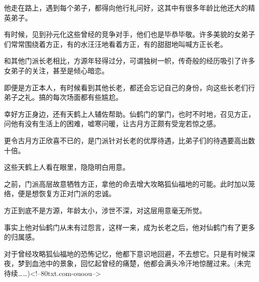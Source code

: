 \begin{this_body}
他走在路上，遇到每个弟子，都得向他行礼问好，这其中有很多年龄比他还大的精英弟子。

有时候，见到孙元化这些曾经的竞争对手，他们也是毕恭毕敬。许多美貌的女弟子们常常围绕着方正，有的水汪汪地看着方正，有的甜甜地叫喊方正长老。

和其他门派长老相比，方源年轻得过分，可谓独树一帜，传奇般的经历吸引了许多女弟子的关注，甚至是倾心暗恋。

即便是方正本人，有时候看到其他长老，都还会忘记自己的身份，向这些长老们行弟子之礼。搞的每次场面都有些尴尬。

幸好方正身边，还有天鹤上人辅佐帮助。仙鹤门的掌门，也时不时地，召见方正，问他有没有生活上的困难，嘘寒问暖，让古月方正颇有受宠若惊之感。

更令古月方正欣喜不已的，是门派针对长老的优厚待遇，比弟子们的待遇要高出数十倍。

这些天鹤上人看在眼里，隐隐明白用意。

之前，门派高层故意牺牲方正，拿他的命去增大攻略狐仙福地的可能。此时加以笼络，便是想恢复方正对门派的忠诚。

方正到底不是方源，年龄太小，涉世不深，对这层用意毫无所觉。

事实上他对仙鹤门从未有过怨言，这样一来，成为长老之后，他对仙鹤门有了更多的归属感。

对于曾经攻略狐仙福地的恐怖记忆，他都下意识地回避，不去想它。只是有时候深夜，梦到血池中的景象，回忆起曾经的痛楚，他都会满头冷汗地惊醒过来。(未完待续……)<!--80txt.com-ouoou-->

\end{this_body}

